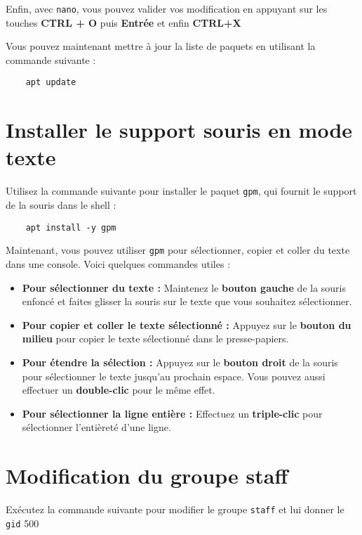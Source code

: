 Enfin, avec \texttt{nano}, vous pouvez valider vos modification en appuyant sur les touches \textbf{CTRL + O} puis \textbf{Entrée} et enfin \textbf{CTRL+X}

Vous pouvez maintenant mettre à jour la liste de paquets en utilisant la commande suivante :

\begin{lstlisting}
	apt update
\end{lstlisting}

\section{Installer le support souris en mode texte}

Utilisez la commande suivante pour installer le paquet \texttt{gpm}, qui fournit le support de la souris dans le shell :

\begin{lstlisting}
	apt install -y gpm
\end{lstlisting}

Maintenant, vous pouvez utiliser \texttt{gpm} pour sélectionner, copier et coller du texte dans une console. Voici quelques commandes utiles :
\begin{itemize}
\item \textbf{Pour sélectionner du texte :} Maintenez le \textbf{bouton gauche} de la souris enfoncé et faites glisser la souris sur le texte que vous souhaitez sélectionner.
\item \textbf{Pour copier et coller le texte sélectionné :} Appuyez sur le \textbf{bouton du milieu} pour copier le texte sélectionné dans le presse-papiers.
\item \textbf{Pour étendre la sélection :} Appuyez sur le \textbf{bouton droit} de la souris pour sélectionner le texte jusqu'au prochain espace. Vous pouvez aussi effectuer un \textbf{double-clic} pour le même effet.
\item \textbf{Pour sélectionner la ligne entière :} Effectuez un \textbf{triple-clic} pour sélectionner l'entièreté d'une ligne.
\end{itemize}

\section{Modification du groupe staff}

Exécutez la commande suivante pour modifier le groupe \texttt{staff} et lui donner le \texttt{gid} 500


